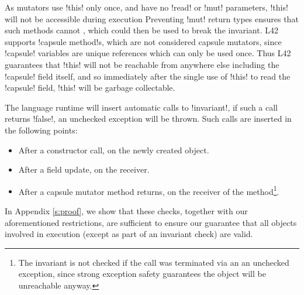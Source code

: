 As \Q@capsule@ mutators use \Q!this! only once,
and have no \Q!read! or \Q!mut! parameters,
\Q!this! will not be accessible during execution \noindent{}
Preventing \Q!mut! return types ensures that such methods cannot , which could then be used to break the invariant.
L42 supports \Q!capsule method!s, which are not considered capsule mutators, since \Q!capsule! variables are unique references which can only be used once. Thus L42 guarantees that \Q!this! will not be reachable from anywhere else including the \Q!capsule! field itself, and so immediately after the single use of \Q!this! to read the \Q!capsule! field, \Q!this! will be garbage collectable.

The language runtime will insert automatic calls to \Q!invariant!, if such a call returns \Q!false!, an unchecked exception will be thrown. Such calls are inserted in the following points:
\begin{itemize}
	\item After a constructor call, on the newly created object.
	\item After a field update, on the receiver.
	\item After a capsule mutator method returns, on the receiver of the method\footnote{The invariant is not checked if the call was terminated via an an unchecked exception, since strong exception safety guarantees the object will be unreachable anyway.}.
\end{itemize}

\noindent In Appendix \ref{s:proof}, we show that these checks, together with our aforementioned restrictions, are sufficient to ensure our guarantee that all objects involved in execution (except as part of an invariant check) are valid.

